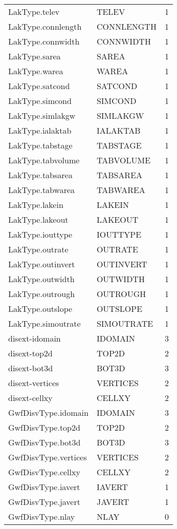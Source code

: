 \begin{longtable}{p{6cm} p{4cm} p{2cm} }
LakType.telev &  TELEV & 1 \\ 
LakType.connlength &  CONNLENGTH & 1 \\ 
LakType.connwidth &  CONNWIDTH & 1 \\ 
LakType.sarea &  SAREA & 1 \\ 
LakType.warea &  WAREA & 1 \\ 
LakType.satcond &  SATCOND & 1 \\ 
LakType.simcond &  SIMCOND & 1 \\ 
LakType.simlakgw &  SIMLAKGW & 1 \\ 
LakType.ialaktab &  IALAKTAB & 1 \\ 
LakType.tabstage &  TABSTAGE & 1 \\ 
LakType.tabvolume &  TABVOLUME & 1 \\ 
LakType.tabsarea &  TABSAREA & 1 \\ 
LakType.tabwarea &  TABWAREA & 1 \\ 
LakType.lakein &  LAKEIN & 1 \\ 
LakType.lakeout &  LAKEOUT & 1 \\ 
LakType.iouttype &  IOUTTYPE & 1 \\ 
LakType.outrate &  OUTRATE & 1 \\ 
LakType.outinvert &  OUTINVERT & 1 \\ 
LakType.outwidth &  OUTWIDTH & 1 \\ 
LakType.outrough &  OUTROUGH & 1 \\ 
LakType.outslope &  OUTSLOPE & 1 \\ 
LakType.simoutrate &  SIMOUTRATE & 1 \\ 
disext-idomain &  IDOMAIN & 3 \\ 
disext-top2d &  TOP2D & 2 \\ 
disext-bot3d &  BOT3D & 3 \\ 
disext-vertices &  VERTICES & 2 \\ 
disext-cellxy &  CELLXY & 2 \\ 
GwfDisvType.idomain &  IDOMAIN & 3 \\ 
GwfDisvType.top2d &  TOP2D & 2 \\ 
GwfDisvType.bot3d &  BOT3D & 3 \\ 
GwfDisvType.vertices &  VERTICES & 2 \\ 
GwfDisvType.cellxy &  CELLXY & 2 \\ 
GwfDisvType.iavert &  IAVERT & 1 \\ 
GwfDisvType.javert &  JAVERT & 1 \\ 
GwfDisvType.nlay &  NLAY & 0 \\ 

\end{longtable}
